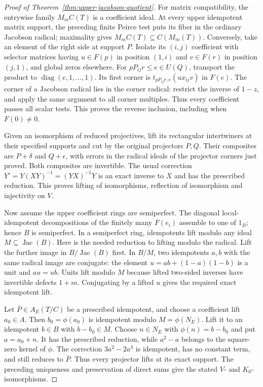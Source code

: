 \begin{proof}[Proof of Theorem~\ref{thm:upper-jacobson-quotient}]
For matrix compatibility, the entrywise family $M_mC(T)$ is a
coefficient ideal. At every upper idempotent matrix support,
the preceding finite Peirce test puts its fiber in the ordinary
Jacobson radical; maximality gives
$M_mC(T)\subseteq C(M_m(T))$. Conversely, take an element of the
right side at support $P$. Isolate its $(i,j)$ coefficient with
selector matrices having $u\in F(p)$ in position $(1,i)$ and
$v\in F(r)$ in position $(j,1)$, and global zeros elsewhere.
For $pP_{ij}r\leq e\in U(Q)$, transport the product to
$\operatorname{diag}(e,1,\ldots,1)$. Its first corner is
$t_{pP_{ij}r,e}(ux_{ij}v)$ in $F(e)$. The corner of a Jacobson
radical lies in the corner radical: restrict the inverse of
$1-z$, and apply the same argument to all corner multiples.
Thus every coefficient passes all scalar tests. This proves the
reverse inclusion, including when $F(0)\ne0$.

Given an isomorphism of reduced projectives, lift its rectangular
intertwiners at their specified supports and cut by the original
projectors $P,Q$. Their composites are $P+\delta$ and
$Q+\epsilon$, with errors in the radical ideals of the projector
corners just proved. Both composites are invertible. The usual
correction
$Y'=Y(XY)^{-1}=(YX)^{-1}Y$
is an exact inverse to $X$ and has the prescribed reduction.
This proves lifting of isomorphisms, reflection of isomorphism
and injectivity on $V$.

Now assume the upper coefficient rings are semiperfect.
The diagonal local-idempotent decompositions of the finitely many
$F(e_i)$ assemble to one of $1_B$; hence $B$ is semiperfect.
In a semiperfect ring, idempotents lift modulo any ideal
$M\subseteq\operatorname{Jac}(B)$. Here is the needed reduction
to lifting modulo the radical. Lift the further image in
$B/\operatorname{Jac}(B)$ first. In $B/M$, two idempotents
$a,b$ with the same radical image are conjugate: the element
$u=ab+(1-a)(1-b)$ is a unit and $au=ub$.
Units lift modulo $M$ because lifted two-sided inverses have
invertible defects $1+m$. Conjugating by a lifted $u$ gives
the required exact idempotent lift.

Let $\bar P\in A_E(T/C)$ be a prescribed idempotent, and choose
a coefficient lift $a_0\in A$. Then $b_0=\phi(a_0)$ is
idempotent modulo $M=\phi(N_E)$. Lift it to an idempotent
$b\in B$ with $b-b_0\in M$. Choose $n\in N_E$ with
$\phi(n)=b-b_0$ and put $a=a_0+n$. It has the prescribed
reduction, while $a^2-a$ belongs to the square-zero kernel of
$\phi$. The correction $3a^2-2a^3$ is idempotent, has no
constant term, and still reduces to $\bar P$.
Thus every projector lifts at its exact support. The preceding
uniqueness and preservation of direct sums give the stated
$V$- and $K_0$-isomorphisms.
\end{proof}

